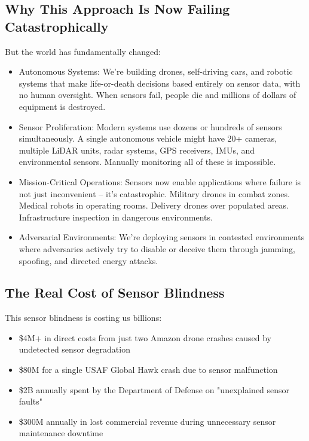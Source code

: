\documentclass[11pt,letterpaper]{article}
\begin{document}
\subsection*{Why This Approach Is Now Failing Catastrophically}

But the world has fundamentally changed:
\begin{itemize}[leftmargin=10pt, itemsep=1pt]
    \item Autonomous Systems: We're building drones, self-driving cars, and robotic systems that make life-or-death decisions based entirely on sensor data, with no human oversight. When sensors fail, people die and millions of dollars of equipment is destroyed.
    \item Sensor Proliferation: Modern systems use dozens or hundreds of sensors simultaneously. A single autonomous vehicle might have 20+ cameras, multiple LiDAR units, radar systems, GPS receivers, IMUs, and environmental sensors. Manually monitoring all of these is impossible.
    \item Mission-Critical Operations: Sensors now enable applications where failure is not just inconvenient – it's catastrophic. Military drones in combat zones. Medical robots in operating rooms. Delivery drones over populated areas. Infrastructure inspection in dangerous environments.
    \item Adversarial Environments: We're deploying sensors in contested environments where adversaries actively try to disable or deceive them through jamming, spoofing, and directed energy attacks.
\end{itemize}

\subsection*{The Real Cost of Sensor Blindness}

This sensor blindness is costing us billions:
\begin{itemize}[leftmargin=10pt, itemsep=1pt]
    \item \$4M+ in direct costs from just two Amazon drone crashes caused by undetected sensor degradation
    \item \$80M for a single USAF Global Hawk crash due to sensor malfunction
    \item \$2B annually spent by the Department of Defense on "unexplained sensor faults"
    \item \$300M annually in lost commercial revenue during unnecessary sensor maintenance downtime
\end{itemize}
\end{document}
